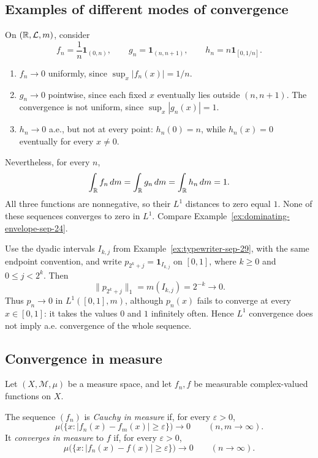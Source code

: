 \subsection{Examples of different modes of convergence}

\begin{example}\label{ex:convergence-modes-oct-01}
  On $(\mathbb{R},\mathcal L,m)$, consider
  \[
    f_n=\frac1n\mathbf 1_{(0,n)},\qquad
    g_n=\mathbf 1_{(n,n+1)},\qquad
    h_n=n\mathbf 1_{[0,1/n]}.
  \]
  \begin{enumerate}[label=(\roman*)]
    \item $f_n\to0$ uniformly, since $\sup_x|f_n(x)|=1/n$.
    \item $g_n\to0$ pointwise, since each fixed $x$ eventually lies
      outside $(n,n+1)$. The convergence is not uniform, since
      $\sup_x|g_n(x)|=1$.
    \item $h_n\to0$ a.e., but not at every point: $h_n(0)=n$, while
      $h_n(x)=0$ eventually for every $x\neq0$.
  \end{enumerate}
  Nevertheless, for every $n$,
  \[
    \int_{\mathbb{R}}f_n\,dm=\int_{\mathbb{R}}g_n\,dm
      =\int_{\mathbb{R}}h_n\,dm=1.
  \]
  All three functions are nonnegative, so their $L^1$ distances to
  zero equal $1$. None of these sequences converges to zero in
  $L^1$. Compare Example~\ref{ex:dominating-envelope-sep-24}.
\end{example}

\begin{example}
  Use the dyadic intervals $I_{k,j}$ from
  Example~\ref{ex:typewriter-sep-29}, with the same endpoint convention,
  and write $p_{2^k+j}=\mathbf 1_{I_{k,j}}$ on $[0,1]$, where
  $k\geq0$ and $0\leq j<2^k$. Then
  \[
    \|p_{2^k+j}\|_1=m(I_{k,j})=2^{-k}\longrightarrow0.
  \]
  Thus $p_n\to0$ in $L^1([0,1],m)$, although $p_n(x)$ fails to
  converge at every $x\in[0,1]$: it takes the values $0$ and $1$
  infinitely often. Hence $L^1$ convergence does not imply a.e.
  convergence of the whole sequence.
\end{example}

\subsection{Convergence in measure}

Let $(X,\mathcal M,\mu)$ be a measure space, and let $f_n,f$ be
measurable complex-valued functions on $X$.

\begin{definition}
  The sequence $(f_n)$ is \emph{Cauchy in measure} if, for every
  $\varepsilon>0$,
  \[
    \mu\bigl(\{x:|f_n(x)-f_m(x)|\geq\varepsilon\}\bigr)
      \longrightarrow0\qquad(n,m\to\infty).
  \]
  It \emph{converges in measure} to $f$ if, for every
  $\varepsilon>0$,
  \[
    \mu\bigl(\{x:|f_n(x)-f(x)|\geq\varepsilon\}\bigr)
      \longrightarrow0\qquad(n\to\infty).
  \]
\end{definition}

